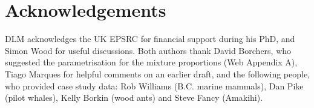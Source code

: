 \documentclass[useAMS,referee,usenatbib]{biom}
\begin{document}
\section*{Acknowledgements}

DLM acknowledges the UK EPSRC for financial support during his PhD, and Simon Wood for useful discussions.  Both authors thank David Borchers, who suggested the parametrisation for the mixture proportions (Web Appendix A), Tiago Marques for helpful comments on an earlier draft, and the following people, who provided case study data: Rob Williams (B.C. marine mammals), Dan Pike (pilot whales), Kelly Borkin (wood ants) and Steve Fancy (Amakihi).




\label{lastpage}
\end{document}
